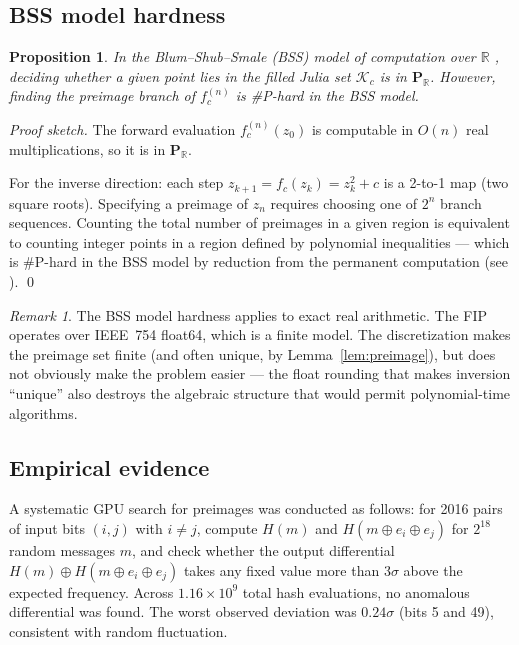 \documentclass[11pt]{article}
\newtheorem{proposition}[theorem]{Proposition}
\theoremstyle{definition}
\theoremstyle{remark}
\newtheorem{remark}[theorem]{Remark}
\begin{document}
\subsection{BSS model hardness}

\begin{proposition}
\label{prop:bss}
In the Blum--Shub--Smale (BSS) model of computation over $\mathbb{R}$
\cite{BlumShubSmale1989}, deciding whether a given point lies in the filled
Julia set $\mathcal{K}_c$ is in $\mathbf{P}_\mathbb{R}$. However, finding the
preimage branch of $f_c^{(n)}$ is \#P-hard in the BSS model.
\end{proposition}

\begin{proof}[Proof sketch]
The forward evaluation $f_c^{(n)}(z_0)$ is computable in $O(n)$ real
multiplications, so it is in $\mathbf{P}_\mathbb{R}$.

For the inverse direction: each step $z_{k+1} = f_c(z_k) = z_k^2 + c$ is a
2-to-1 map (two square roots). Specifying a preimage of $z_n$ requires choosing
one of $2^n$ branch sequences. Counting the total number of preimages in a
given region is equivalent to counting integer points in a region defined by
polynomial inequalities --- which is \#P-hard in the BSS model by reduction
from the permanent computation (see \cite{Burgisser2000}).
\qed
\end{proof}

\begin{remark}
The BSS model hardness applies to exact real arithmetic. The FIP operates
over IEEE~754 float64, which is a finite model. The discretization makes the
preimage set finite (and often unique, by Lemma~\ref{lem:preimage}), but does
not obviously make the problem easier --- the float rounding that makes
inversion ``unique'' also destroys the algebraic structure that would permit
polynomial-time algorithms.
\end{remark}

\subsection{Empirical evidence}

A systematic GPU search for preimages was conducted as follows: for 2016
pairs of input bits $(i, j)$ with $i \neq j$, compute
$H(m)$ and $H(m \oplus e_i \oplus e_j)$ for $2^{18}$ random messages $m$,
and check whether the output differential $H(m) \oplus H(m \oplus e_i \oplus e_j)$
takes any fixed value more than $3\sigma$ above the expected frequency.
Across $1.16 \times 10^9$ total hash evaluations, no anomalous differential
was found. The worst observed deviation was $0.24\sigma$ (bits 5 and 49),
consistent with random fluctuation.
\end{document}

